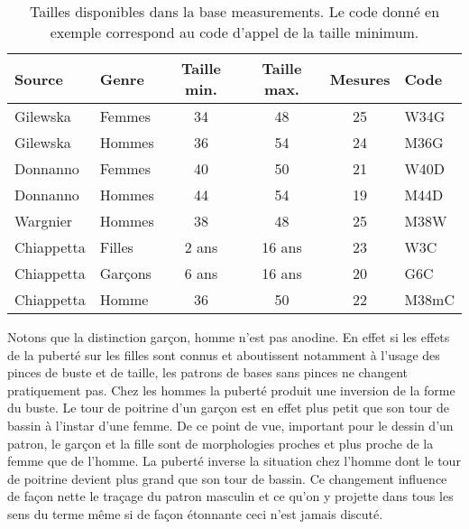 \documentclass[10pt,a4paper,twoside]{report}
\begin{document}
\begin{table}[htb]
\begin{center}
\begin{tabular}{llcccl} \hline
Source & Genre & Taille min. & Taille max. & Mesures & Code\\ \hline
Gilewska & Femmes & 34 & 48 & 25 &  W34G\\
Gilewska & Hommes & 36 & 54 & 24 & M36G\\
Donnanno & Femmes & 40 & 50 & 21 & W40D\\
Donnanno & Hommes & 44 & 54 & 19 & M44D\\
Wargnier & Hommes & 38 & 48 & 25 & M38W\\
Chiappetta & Filles & 2 ans & 16 ans &23& W3C\\
Chiappetta & Garçons & 6 ans & 16 ans &20& G6C\\
Chiappetta & Homme & 36 & 50 & 22 & M38mC\\ \hline
\end{tabular}
\end{center}
\label{tab:meas_sum}
\caption{Tailles disponibles dans la base measurements. Le code donné en exemple correspond au code d'appel de la taille minimum.}
\end{table}

Notons que la distinction garçon, homme n'est pas anodine. En effet si les effets de la puberté sur les filles sont connus et aboutissent notamment à l'usage  des pinces de buste et de taille, les patrons de bases sans pinces ne changent pratiquement pas. Chez les hommes la puberté produit une inversion de la forme du buste. Le tour de poitrine d'un garçon est en effet plus petit que  son tour de bassin à l'instar d'une femme. De ce point de vue, important pour le dessin d'un patron, le garçon et la fille sont de morphologies proches et plus proche de la femme que de l'homme. La puberté inverse la situation chez l'homme dont le tour de poitrine devient plus grand que son tour de bassin. Ce changement influence de façon nette le traçage du patron masculin et ce qu'on y projette dans tous les sens du terme même si de façon étonnante ceci n'est jamais discuté.
\end{document}
